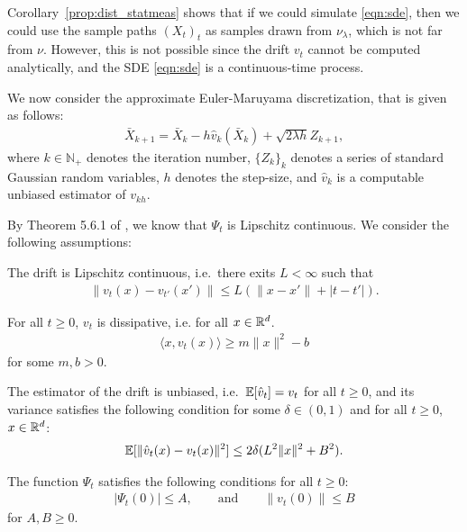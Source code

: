 Corollary~\ref{prop:dist_statmeas} shows that if we could simulate \eqref{eqn:sde}, then we could use the sample paths $(X_t)_t$ as
samples drawn from $\nu_\lambda$, which is not far from $\nu$. However, this is not possible since the drift $v_t$ cannot be computed analytically, and the SDE \eqref{eqn:sde} is a continuous-time process.

We now consider the approximate Euler-Maruyama discretization, that is given as follows:
\begin{align}
\bar{X}_{k+1} = \bar{X}_k - h \hat{v}_k(\bar{X}_k) + \sqrt{2 \lambda h} Z_{k+1},
\end{align}
where $k \in \mathbb{N}_+$ denotes the iteration number, $\{Z_k\}_{k}$ denotes a series of standard Gaussian random variables, $h$ denotes the step-size, and $\hat{v}_k$ is a computable unbiased estimator of $v_{kh}$.


By Theorem 5.6.1 of \cite{bonnotte2013unidimensional}, we know that $\Psi_t$ is Lipschitz continuous. We consider the following assumptions:
\begin{assumption}
\label{asmp:lipschitz}
The drift is Lipschitz continuous, i.e.\ there exits $L < \infty$ such that
\begin{align}
\| v_t(x) - v_{t'}(x') \| \leq L ( \|x-x' \| + |t-t'|).
\end{align}
\end{assumption}
%
\begin{assumption}
\label{asmp:dissip}
For all $t \geq 0$, $v_t$ is dissipative, i.e. for all $x \in \mathbb{R}^d$.
\begin{align}
\langle x, v_t(x) \rangle \geq m \|x\|^2 -b
\end{align}
for some $m,b >0$.
\end{assumption}
%
\begin{assumption}
\label{asmp:stochgrad}
The estimator of the drift is unbiased, i.e.\ $\mathbb{E}[\hat{v}_t] = v_t$ for all $t \geq 0$, and its variance satisfies the following condition for some $\delta \in (0,1)$ and for all $t\geq 0$, $x \in \mathbb{R}^d$:
\begin{align}
\mathbb{E}[ \|\hat{v}_t(x) - v_t(x) \|^2] \leq 2 \delta(L^2 \|x\|^2 + B^2).
\end{align}
\end{assumption}
%
\begin{assumption}
\label{asmp:init_fun}
The function $\Psi_t$ satisfies the following conditions for all $t \geq 0$:
\begin{align}
|\Psi_t(0)| \leq A, \qquad \text{and} \qquad \|v_t(0)\| \leq B
\end{align}
for $A,B \geq 0$.
\end{assumption}


